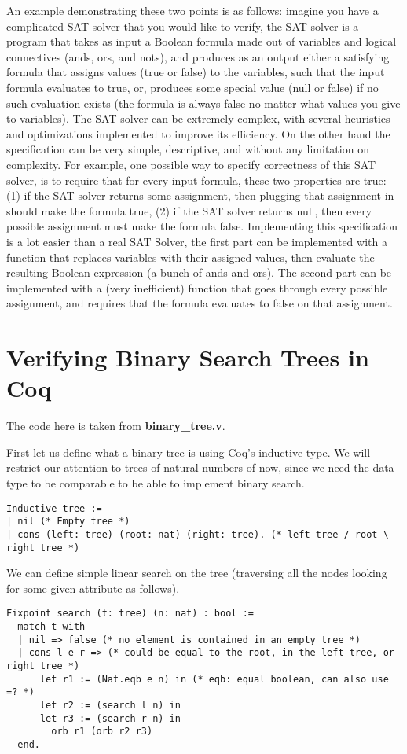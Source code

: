 \documentclass{article}
\begin{document}
An example demonstrating these two points is as follows: imagine you have a complicated SAT solver that you would like to verify, the SAT
solver is a program that takes as input a Boolean formula made out of variables and logical connectives (ands, ors, and nots), and produces as 
an output either a satisfying formula that assigns values (true or false) to the variables, such that the input formula evaluates to true, or, produces
some special value (null or false) if no such evaluation exists (the formula is always false no matter what values you give to variables). The SAT 
solver can be extremely complex, with several heuristics and optimizations implemented to improve its efficiency. On the other hand the specification can be
very simple, descriptive, and without any limitation on complexity. For example, one possible way to specify correctness of this SAT solver, is to require
that for every input formula, these two properties are true: (1) if the SAT solver returns some assignment, then plugging that assignment in should make the
formula true, (2) if the SAT solver returns null, then every possible assignment must make the formula false. Implementing this specification is a lot
easier than a real SAT Solver, the first part can be implemented with a function that replaces variables with their assigned values, then evaluate the resulting
Boolean expression (a bunch of ands and ors). The second part can be implemented with a (very inefficient) function that goes through every possible assignment,
and requires that the formula evaluates to false on that assignment.

\section{Verifying Binary Search Trees in Coq}

The code here is taken from \textbf{binary\_tree.v}.

First let us define what a binary tree is using Coq's inductive type. We will restrict our
attention to trees of natural numbers of now, since we need the data type to be comparable
to be able to implement binary search.
\begin{verbatim}
Inductive tree :=
| nil (* Empty tree *)
| cons (left: tree) (root: nat) (right: tree). (* left tree / root \ right tree *)
\end{verbatim}

We can define simple linear search on the tree (traversing all the nodes looking for
some given attribute as follows).
\begin{verbatim}
Fixpoint search (t: tree) (n: nat) : bool :=
  match t with
  | nil => false (* no element is contained in an empty tree *)
  | cons l e r => (* could be equal to the root, in the left tree, or right tree *)
      let r1 := (Nat.eqb e n) in (* eqb: equal boolean, can also use =? *)
      let r2 := (search l n) in
      let r3 := (search r n) in
        orb r1 (orb r2 r3)
  end.
\end{verbatim}
\end{document}
